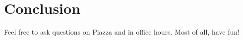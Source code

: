\section{Conclusion}
Feel free to ask questions on Piazza and in office hours. Most of all, have fun!

